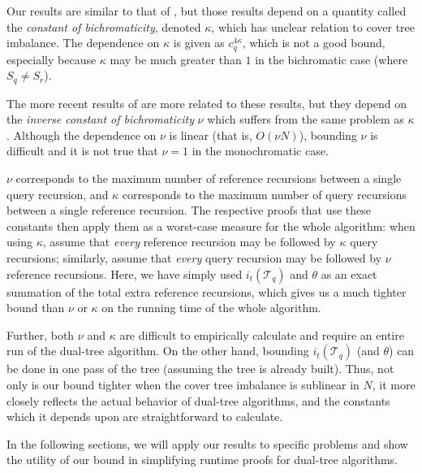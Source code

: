 Our results are similar to that of \citet{ram2009}, but those results depend on
a quantity called the {\it constant of bichromaticity}, denoted $\kappa$, which
has unclear relation to cover tree imbalance.  The dependence on $\kappa$ is
given as $c_q^{4 \kappa}$, which is not a good bound, especially because
$\kappa$ may be much greater than $1$ in the bichromatic case (where $S_q \ne
S_r$).

The more recent results of \citet{curtin2014dual} are more related to these
results, but they depend on the {\it inverse constant of bichromaticity} $\nu$
which suffers from the same problem as $\kappa$.  Although the dependence on
$\nu$ is linear (that is, $O(\nu N)$), bounding $\nu$ is difficult and it is not
true that $\nu = 1$ in the monochromatic case.

$\nu$ corresponds to the maximum number of reference recursions between a single
query recursion, and $\kappa$ corresponds to the maximum number of query
recursions between a single reference recursion.  The respective proofs that use
these constants then apply them as a worst-case measure for the whole algorithm:
when using $\kappa$, \citet{ram2009} assume that {\it every} reference recursion
may be followed by $\kappa$ query recursions; similarly, \citet{curtin2014dual}
assume that {\it every} query recursion may be followed by $\nu$ reference
recursions.  Here, we have simply used $i_t(\mathscr{T}_q)$ and $\theta$ as an
exact summation of the total extra reference recursions, which gives us a much
tighter bound than $\nu$ or $\kappa$ on the running time of the whole algorithm.

Further, both $\nu$ and $\kappa$ are difficult to empirically calculate and
require an entire run of the dual-tree algorithm.  On the other hand, bounding
$i_t(\mathscr{T}_q)$ (and $\theta$) can be done in one pass of the tree
(assuming the tree is already built).  Thus, not only is our bound tighter when
the cover tree imbalance is sublinear in $N$, it more closely reflects the
actual behavior of dual-tree algorithms, and the constants which it depends upon
are straightforward to calculate.

In the following sections, we will apply our results to specific problems and
show the utility of our bound in simplifying runtime proofs for dual-tree
algorithms.



